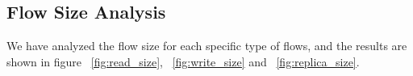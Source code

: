 \subsection{\bf Flow Size Analysis}
We have analyzed the flow size for each specific type of flows, and the results are shown in figure ~\ref{fig:read_size}, ~\ref{fig:write_size} and ~\ref{fig:replica_size}.




